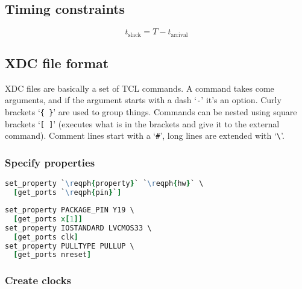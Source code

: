 \documentclass[margin=small]{tex/hsrzf}
\begin{document}
\subsection{Timing constraints}


\[
  t_\text{slack} = T - t_\text{arrival}
\]

\subsection{XDC file format}

XDC files are basically a set of TCL commands. A command takes come arguments, and if the argument starts with a dash `\texttt{-}' it's an option. Curly brackets `\texttt{\{ \}}' are used to group things. Commands can be nested using square brackets `\texttt{[ ]}' (executes what is in the brackets and give it to the external command). Comment lines start with a `\texttt{\#}', long lines are extended with `\texttt{\textbackslash}'.

\subsubsection{Specify properties}

\begin{lstlisting}[language = tcl]
set_property `\reqph{property}` `\reqph{hw}` \
  [get_ports `\reqph{pin}`]
\end{lstlisting}
\begin{lstlisting}[language = tcl]
set_property PACKAGE_PIN Y19 \
  [get_ports x[1]]
set_property IOSTANDARD LVCMOS33 \
  [get_ports clk]
set_property PULLTYPE PULLUP \
  [get_ports nreset]
\end{lstlisting}

\subsubsection{Create clocks}
\end{document}
